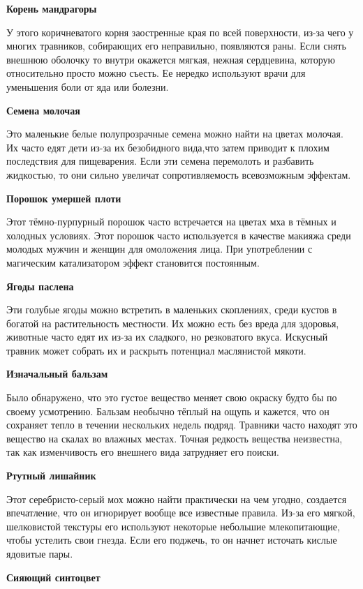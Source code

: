 \documentclass[a4paper, 9pt, twocolumn]{book}
\newcommand{\partc}[2][]{{
		\bigskip
		\noindent
		\hspace{-0.25cm}
		\fontsize{11pt}{13.2}
		\color{sectioncolor}
		\textbf{#2}}
	
	{
		\ifx\relax#1\relax
		\else
		\noindent
		\normalcolor
		\textbf{#1}}
	\bigskip
	\fi
}
\begin{document}
	\partc{Корень мандрагоры}
	
	\noindent  У этого коричневатого корня заостренные края по всей поверхности, из-за чего у многих травников, собирающих его неправильно, появляются раны. Если снять внешнюю оболочку то внутри окажется мягкая, нежная сердцевина, которую относительно просто можно съесть. Ее нередко используют врачи для уменьшения боли от яда или болезни.
	
	\partc{Семена молочая}
	
	\noindent Это маленькие белые полупрозрачные семена можно найти на цветах молочая. Их часто едят дети из-за их безобидного вида,что затем приводит к плохим последствия для пищеварения. Если эти семена перемолоть и разбавить жидкостью, то они сильно увеличат сопротивляемость всевозможным эффектам.
	
	\partc{Порошок умершей плоти} %
	
	\noindent Этот тёмно-пурпурный порошок часто встречается на цветах мха в тёмных и холодных условиях. Этот порошок часто используется в качестве макияжа среди молодых мужчин и женщин для омоложения лица. При употреблении с магическим катализатором эффект становится постоянным.
	
	\partc{Ягоды паслена}
	
	\noindent Эти голубые ягоды можно встретить в маленьких скоплениях, среди кустов в богатой на растительность местности. Их можно есть без вреда для здоровья, животные часто едят их из-за их сладкого, но резковатого вкуса. Искусный травник может собрать их и раскрыть потенциал маслянистой мякоти.
	
	\partc{Изначальный бальзам}
	
	\noindent Было обнаружено, что это густое вещество меняет свою окраску будто бы по своему усмотрению. Бальзам необычно тёплый на ощупь и кажется, что он сохраняет тепло в течении нескольких недель подряд. Травники часто находят это вещество на скалах во влажных местах. Точная редкость вещества неизвестна, так как изменчивость его внешнего вида затрудняет его поиски.
	
	\partc{Ртутный лишайник}
	
	\noindent Этот серебристо-серый мох можно найти практически на чем угодно, создается впечатление, что он игнорирует вообще все известные правила. Из-за его мягкой, шелковистой текстуры его используют некоторые небольшие млекопитающие, чтобы устелить свои гнезда. Если его поджечь, то он начнет источать кислые ядовитые пары.
	
	\partc{Сияющий синтоцвет}
	
\end{document}
